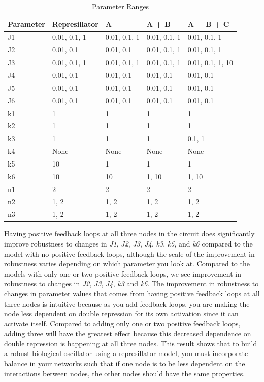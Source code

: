 \documentclass{article}
\begin{document}
\begin{table}[H]
\centering
\begin{tabular}{|l|l|l|l|l|}
\hline
\textbf{Parameter} & \textbf{Represillator} & \textbf{A} & \textbf{A + B} & \textbf{A + B + C} \\
\hline
J1 & 0.01, 0.1, 1 & 0.01, 0.1, 1 & 0.01, 0.1, 1 & 0.01, 0.1, 1 \\
J2 & 0.01, 0.1 & 0.01, 0.1 & 0.01, 0.1, 1 & 0.01, 0.1, 1 \\
J3 & 0.01, 0.1, 1 & 0.01, 0.1, 1 & 0.01, 0.1, 1 & 0.01, 0.1, 1, 10 \\
J4 & 0.01, 0.1 & 0.01, 0.1 & 0.01, 0.1 & 0.01, 0.1 \\
J5 & 0.01, 0.1 & 0.01, 0.1 & 0.01, 0.1 & 0.01, 0.1 \\
J6 & 0.01, 0.1 & 0.01, 0.1 & 0.01, 0.1 & 0.01, 0.1 \\
k1 & 1 & 1 & 1 & 1 \\
k2 & 1 & 1 & 1 & 1 \\
k3 & 1 & 1 & 1 & 0.1, 1 \\
k4 & None & None & None & None \\
k5 & 10 & 1 & 1 & 1 \\
k6 & 10 & 10 & 1, 10 & 1, 10 \\
n1 & 2 & 2 & 2 & 2 \\
n2 & 1, 2 & 1, 2 & 1, 2 & 1, 2 \\
n3 & 1, 2 & 1, 2 & 1, 2 & 1, 2 \\
\hline
\end{tabular}
\caption{Parameter Ranges}
\end{table}


Having positive feedback loops at all three nodes in the circuit does significantly improve robustness to changes in \textit{J1}, \textit{J2}, \textit{J3}, \textit{J4}, \textit{k3}, \textit{k5}, and \textit{k6} compared to the model with no positive feedback loops, although the scale of the improvement in robustness varies depending on which parameter you look at. Compared to the models with only one or two positive feedback loops, we see improvement in robustness to changes in \textit{J2}, \textit{J3}, \textit{J4}, \textit{k3} and \textit{k6}. The improvement in robustness to changes in parameter values that comes from having positive feedback loops at all three nodes is intuitive because as you add feedback loops, you are making the node less dependent on double repression for its own activation since it can activate itself. Compared to adding only one or two positive feedback loops, adding three will have the greatest effect because this decreased dependence on double repression is happening at all three nodes. This result shows that to build a robust biological oscillator using a represillator model, you must incorporate balance in your networks such that if one node is to be less dependent on the interactions between nodes, the other nodes should have the same properties. 
\end{document}
